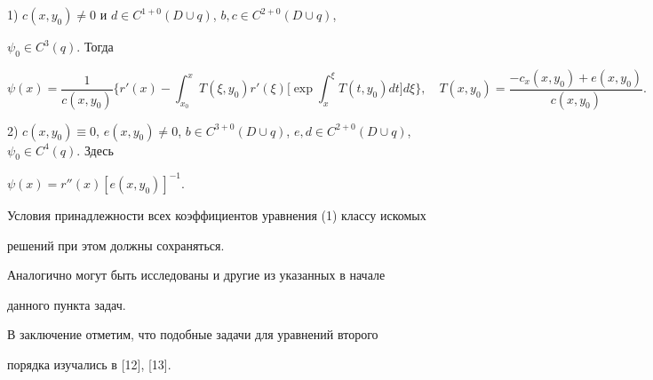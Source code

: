  


1) $c(x,y_0)\ne0$ и $d\in C^{1+0}(D\cup q)$, $b,c\in C^{2+0}(D\cup q)$, 


$\psi_0\in C^3(q)$. Тогда


$$ 


\psi(x)=\frac{1}{c(x,y_0)}\bigg\{r'(x)-\int^x_{x_0} 


T(\xi,y_0)r'(\xi)\bigg[\exp\int^\xi_x T(t,y_0)dt\bigg]d\xi\bigg\}, 


\quad T(x,y_0)=\frac{-c_x(x,y_0)+e(x,y_0)}{c(x,y_0)}. 


$$ 


 


2) $c(x,y_0)\equiv0$, $e(x,y_0)\ne0$, $b\in C^{3+0}(D\cup q)$, $e,d\in 


C^{2+0}(D\cup q)$, $\psi_0\in C^4(q)$. Здесь


$\psi(x)=r''(x)[e(x,y_0)]^{-1}$. 


 


Условия принадлежности всех коэффициентов уравнения (1) классу искомых  


решений при этом должны сохраняться. 


 


Аналогично могут быть исследованы и другие из указанных в начале  


данного пункта задач. 


 


В заключение отметим, что подобные задачи для уравнений второго  


порядка изучались в [12], [13]. 


 


